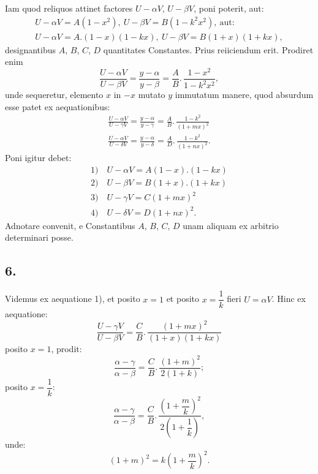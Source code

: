 \documentclass{article}
\begin{document}
Iam quod reliquos attinet factores $U-\alpha V$, $U-\beta V$, poni poterit, aut:
\[
\begin{gathered}
U-\alpha V=A(1-x^{2}),\ U-\beta V=B(1-k^{2}x^{2}),\ \text{aut:}\\
U-\alpha V=A.(1-x)(1-kx),\ U-\beta V=B(1+x)(1+kx),
\end{gathered}
\]
designantibus $A$, $B$, $C$, $D$ quantitates Constantes. Prius reiiciendum erit. Prodiret enim
\[
\frac{U-\alpha V}{U-\beta V}=\frac{y-\alpha}{y-\beta}=\frac{A}{B}.\,\frac{1-x^{2}}{1-k^{2}x^{2}},
\]
unde sequeretur, elemento $x$ in $-x$ mutato $y$ immutatum manere, quod absurdum esse patet ex aequationibus:
\[
\begin{gathered}
\frac{U-\alpha V}{U-\gamma V}=\frac{y-\alpha}{y-\gamma}=\frac{A}{B}.\,\frac{1-k^{2}}{(1+mx)^{2}}\\
\frac{U-\alpha V}{U-\delta V}=\frac{y-\alpha}{y-\delta}=\frac{A}{D}.\,\frac{1-k^{2}}{(1+nx)^{2}}.
\end{gathered}
\]
Poni igitur debet:
\[
\begin{gathered}
\text{1)}\quad U-\alpha V=A(1-x).(1-kx)\\
\text{2)}\quad U-\beta V=B(1+x).(1+kx)\\
\text{3)}\quad U-\gamma V=C(1+mx)^{2}\\
\text{4)}\quad U-\delta V=D(1+nx)^{2}.
\end{gathered}
\]
Adnotare convenit, e Constantibus $A$, $B$, $C$, $D$ unam aliquam ex arbitrio determinari posse.

\subsection*{6.}

Videmus ex aequatione 1), et posito $x=1$ et posito $x=\dfrac{1}{k}$ fieri $U=\alpha V$. Hinc ex aequatione:
\[
\frac{U-\gamma V}{U-\beta V}=\frac{C}{B}.\,\frac{(1+mx)^{2}}{(1+x)(1+kx)}
\]
posito $x=1$, prodit:
\[
\frac{\alpha-\gamma}{\alpha-\beta}=\frac{C}{B}.\,\frac{(1+m)^{2}}{2(1+k)};
\]
posito $x=\dfrac{1}{k}$:
\[
\frac{\alpha-\gamma}{\alpha-\beta}=\frac{C}{B}.\,\frac{\left(1+\dfrac{m}{k}\right)^{2}}{2\left(1+\dfrac{1}{k}\right)},
\]
unde:
\[
(1+m)^{2}=k\left(1+\frac{m}{k}\right)^{2}.
\]
\end{document}
